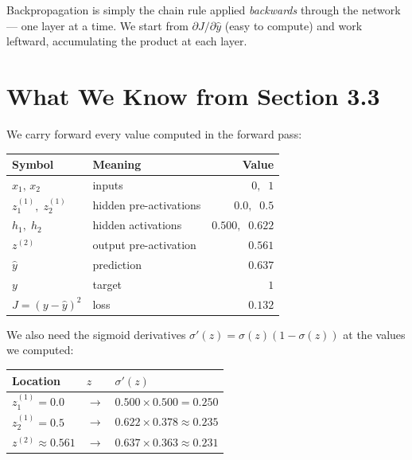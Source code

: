\documentclass[12pt, a4paper]{article}
\theoremstyle{definition}
\newcommand{\yhat}{\hat{y}}
\newcommand{\sigmoid}{\sigma}
\begin{document}
\begin{notebox}
Backpropagation is simply the chain rule applied \emph{backwards} through
the network --- one layer at a time.  We start from $\partial J/\partial
\yhat$ (easy to compute) and work leftward, accumulating the product at
each layer.
\end{notebox}

\section{What We Know from Section 3.3}

We carry forward every value computed in the forward pass:

\begin{center}
\renewcommand{\arraystretch}{1.3}
\begin{tabular}{llr}
\toprule
Symbol & Meaning & Value \\
\midrule
$x_1,\, x_2$ & inputs & $0,\;\; 1$ \\
$z^{(1)}_1,\; z^{(1)}_2$ & hidden pre-activations & $0.0,\;\; 0.5$ \\
$h_1,\; h_2$ & hidden activations & $0.500,\;\; 0.622$ \\
$z^{(2)}$ & output pre-activation & $0.561$ \\
$\yhat$ & prediction & $0.637$ \\
$y$ & target & $1$ \\
$J = (y-\yhat)^2$ & loss & $0.132$ \\
\bottomrule
\end{tabular}
\end{center}

We also need the sigmoid derivatives $\sigmoid'(z) = \sigmoid(z)(1-\sigmoid(z))$
at the values we computed:

\begin{center}
\renewcommand{\arraystretch}{1.3}
\begin{tabular}{lll}
\toprule
Location & $z$ & $\sigmoid'(z)$ \\
\midrule
$z^{(1)}_1 = 0.0$ & $\to$ & $0.500 \times 0.500 = 0.250$ \\
$z^{(1)}_2 = 0.5$ & $\to$ & $0.622 \times 0.378 \approx 0.235$ \\
$z^{(2)} \approx 0.561$ & $\to$ & $0.637 \times 0.363 \approx 0.231$ \\
\bottomrule
\end{tabular}
\end{center}
\end{document}
